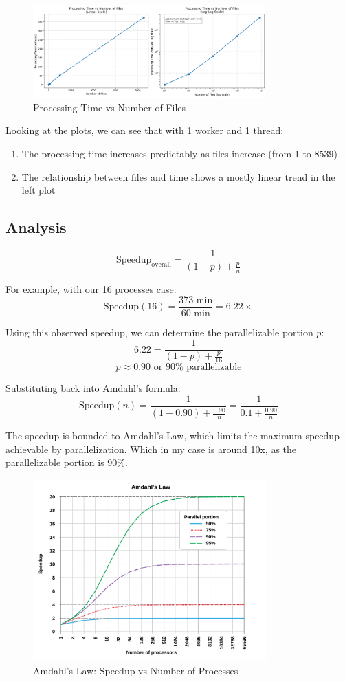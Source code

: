 \documentclass[11pt,a4paper]{article}
\begin{document}
\begin{figure}[H]
    \centering
    \includegraphics[width=0.8\textwidth]{runtime2.png}
    \caption{Processing Time vs Number of Files}
\end{figure}

Looking at the plots, we can see that with 1 worker and 1 thread:
\begin{enumerate}
    \item The processing time increases predictably as files increase (from 1 to 8539)
    \item The relationship between files and time shows a mostly linear trend in the left plot
\end{enumerate}

\subsection{Analysis}

\[ \text{Speedup}_{\text{overall}} = \frac{1}{(1-p) + \frac{p}{n}} \]

For example, with our 16 processes case:
\[ \text{Speedup}(16) = \frac{373 \text{ min}}{60 \text{ min}} = 6.22\times \]

Using this observed speedup, we can determine the parallelizable portion $p$:
\[ 6.22 = \frac{1}{(1-p) + \frac{p}{16}} \]
\[ p \approx 0.90 \text{ or } 90\% \text{ parallelizable} \]

Substituting back into Amdahl's formula:
\[ \text{Speedup}(n) = \frac{1}{(1-0.90) + \frac{0.90}{n}} = \frac{1}{0.1 + \frac{0.90}{n}} \]


The speedup is bounded to Amdahl's Law, which limits the maximum speedup achievable by parallelization.
Which in my case is around 10x, as the parallelizable portion is 90\%.

\begin{figure}[H]
    \centering
    \includegraphics[width=0.8\textwidth]{amdahl.png}
    \caption{Amdahl's Law: Speedup vs Number of Processes}
\end{figure}
\end{document}
